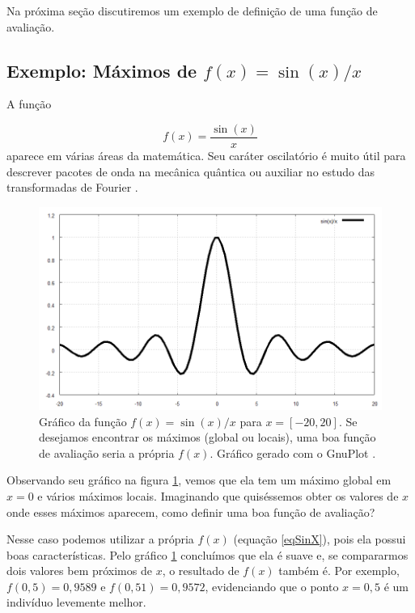 	Na próxima seção discutiremos um exemplo de definição de uma função de avaliação.
		
	\subsection{\label{MaxSeno}Exemplo: Máximos de $f(x) = \sin(x) / x$}
	
	A função
	
	\begin{equation}\label{eqSinX}
		f(x) = \frac{\sin(x)}{x}
	\end{equation}
	aparece em várias áreas da matemática. Seu caráter oscilatório é muito útil para descrever pacotes de onda na mecânica quântica \cite{QuGA2006} ou auxiliar no estudo das transformadas de Fourier \cite{James2002}.
	
	\begin{figure}[htp]
		\begin{center}
			\includegraphics[width=13cm]{figs/ga/sen_x__x.png}
		\end{center}
		\caption{\label{figSen}Gráfico da função $f(x) = \sin(x) / x$ para $x = [-20,20]$. Se desejamos encontrar os máximos (global ou locais), uma boa função de avaliação seria a própria $f(x)$. Gráfico gerado com o GnuPlot \cite{gnuplot}.}
	\end{figure}
	
	Observando seu gráfico na figura \ref{figSen}, vemos que ela tem um máximo global em $x = 0$ e vários máximos locais. Imaginando que quiséssemos obter os valores de $x$ onde esses máximos aparecem, como definir uma boa função de avaliação?
	
	Nesse caso podemos utilizar a própria $f(x)$ (equação \ref{eqSinX}), pois ela possui boas características. Pelo gráfico \ref{figSen} concluímos que ela é suave e, se compararmos dois valores bem próximos de $x$, o resultado de $f(x)$ também é. Por exemplo, $f(0,5) = 0,9589$ e $f(0,51) = 0,9572$, evidenciando que o ponto $x = 0,5$ é um indivíduo levemente melhor.
	
